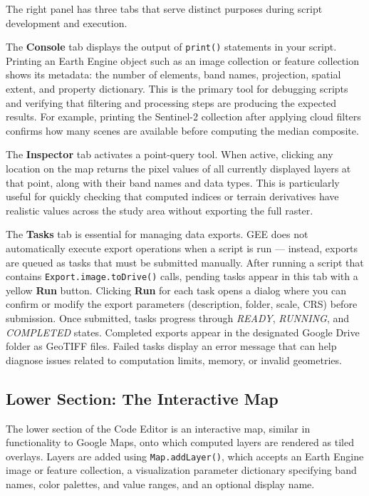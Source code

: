 \documentclass[
  10pt,
  b5paper,
  oneside]{book}
\begin{document}
The right panel has three tabs that serve distinct purposes during script development and execution.

The \textbf{Console} tab displays the output of \texttt{print()} statements in your script. Printing an Earth Engine object such as an image collection or feature collection shows its metadata: the number of elements, band names, projection, spatial extent, and property dictionary. This is the primary tool for debugging scripts and verifying that filtering and processing steps are producing the expected results. For example, printing the Sentinel-2 collection after applying cloud filters confirms how many scenes are available before computing the median composite.

The \textbf{Inspector} tab activates a point-query tool. When active, clicking any location on the map returns the pixel values of all currently displayed layers at that point, along with their band names and data types. This is particularly useful for quickly checking that computed indices or terrain derivatives have realistic values across the study area without exporting the full raster.

The \textbf{Tasks} tab is essential for managing data exports. GEE does not automatically execute export operations when a script is run --- instead, exports are queued as tasks that must be submitted manually. After running a script that contains \texttt{Export.image.toDrive()} calls, pending tasks appear in this tab with a yellow \textbf{Run} button. Clicking \textbf{Run} for each task opens a dialog where you can confirm or modify the export parameters (description, folder, scale, CRS) before submission. Once submitted, tasks progress through \emph{READY}, \emph{RUNNING}, and \emph{COMPLETED} states. Completed exports appear in the designated Google Drive folder as GeoTIFF files. Failed tasks display an error message that can help diagnose issues related to computation limits, memory, or invalid geometries.

\subsection{Lower Section: The Interactive Map}\label{lower-section-the-interactive-map}

The lower section of the Code Editor is an interactive map, similar in functionality to Google Maps, onto which computed layers are rendered as tiled overlays. Layers are added using \texttt{Map.addLayer()}, which accepts an Earth Engine image or feature collection, a visualization parameter dictionary specifying band names, color palettes, and value ranges, and an optional display name.
\end{document}
